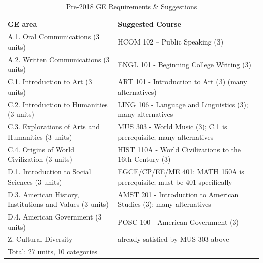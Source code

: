 \documentclass{book}
\begin{document}
\begin{table}
\caption{Pre-2018 GE Requirements \& Suggestions}
\begin{center}
\begin{tabular}{| p{3in} | p{3in} |} \hline
  \textbf{GE area} & \textbf{Suggested Course} \\ \hline
  A.1. Oral Communications (3 units) & HCOM 102 – Public Speaking (3) \\ \hline
  A.2. Written Communications (3 units) & ENGL 101 - Beginning College Writing (3) \\ \hline
  C.1. Introduction to Art (3 units) & ART 101 - Introduction to Art (3) (many alternatives) \\ \hline
  C.2. Introduction to Humanities (3 units) & LING 106 - Language and Linguistics (3); many alternatives \\ \hline
  C.3. Explorations of Arts and Humanities (3 units) & MUS 303 - World Music (3); C.1 is prerequisite; many alternatives \\ \hline
  C.4. Origins of World Civilization (3 units) & HIST 110A - World Civilizations to the 16th Century (3) \\ \hline
  D.1. Introduction to Social Sciences (3 units) & EGCE/CP/EE/ME 401; MATH 150A is prerequisite; must be 401 specifically \\ \hline
  D.3. American History, Institutions and Values (3 units) & AMST 201 - Introduction to American Studies (3); many alternatives \\ \hline
  D.4. American Government (3 units) & POSC 100 - American Government (3) \\ \hline
  Z. Cultural Diversity & already satisfied by MUS 303 above \\ \hline
  \multicolumn{2}{|l|}{Total: 27 units, 10 categories} \\ \hline
\end{tabular}
\end{center}
\end{table}
\end{document}

